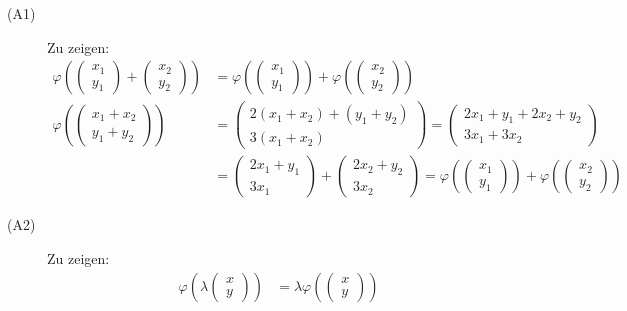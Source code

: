 \begin{description}
	\item[(A1)]{Zu zeigen:
	\begin{align*}
		\varphi\left(\begin{pmatrix}x_1\\y_1\end{pmatrix} + \begin{pmatrix}x_2\\y_2\end{pmatrix}\right) &= \varphi\left(\begin{pmatrix}x_1\\y_1\end{pmatrix}\right) + \varphi\left(\begin{pmatrix}x_2\\y_2\end{pmatrix}\right) \\[0.5cm]
		\varphi\left(\begin{pmatrix}x_1+x_2\\y_1+y_2\end{pmatrix}\right) &= \begin{pmatrix}2 (x_1+x_2) + (y_1+y_2)\\3(x_1+x_2)\end{pmatrix} = \begin{pmatrix}2 x_1 + y_1 + 2 x_2 + y_2\\3 x_1 + 3 x_2\end{pmatrix} \\
		&= \begin{pmatrix}2 x_1 + y_1 \\ 3 x_1\end{pmatrix} + \begin{pmatrix}2 x_2 + y_2 \\ 3 x_2\end{pmatrix} = \varphi\left(\begin{pmatrix}x_1\\y_1\end{pmatrix}\right) + \varphi\left(\begin{pmatrix}x_2\\y_2\end{pmatrix}\right)
	\end{align*}
	}
	\item[(A2)]{Zu zeigen:
	\begin{align*}
		\varphi\left(\lambda\begin{pmatrix}x\\y\end{pmatrix}\right) &= \lambda \varphi\left(\begin{pmatrix}x\\y\end{pmatrix}\right) \\[0.5cm]

\end{align*}}
\end{description}
